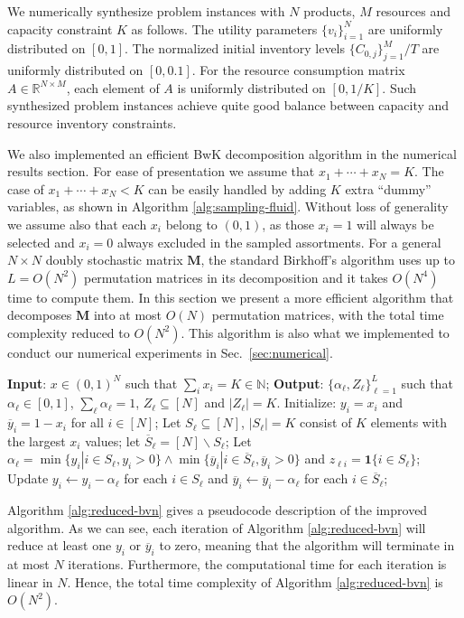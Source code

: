 \documentclass[opre]{informs3aa}
\newcommand{\vct}{\boldsymbol }
\newcommand{\mat}{\mathbf }
\renewcommand{\bar}{\overline}
\renewcommand{\bar}{\overline}
\begin{document}
\begin{appendices}
We numerically synthesize problem instances with $N$ products, $M$ resources and capacity constraint $K$ as follows.
The utility parameters $\{v_i\}_{i=1}^N$ are uniformly distributed on $[0,1]$.
The normalized initial inventory levels $\{C_{0,j}\}_{j=1}^M/T$ are uniformly distributed on $[0,0.1]$.
For the resource consumption matrix $A\in\mathbb R^{N\times M}$, each element of $A$ is uniformly distributed on $[0,1/K]$.
Such synthesized problem instances achieve quite good balance between capacity and resource inventory constraints.


We also implemented an efficient BwK decomposition algorithm in the numerical results section.
For ease of presentation we assume that $x_1+\cdots+x_N=K$. The case of $x_1+\cdots+x_N<K$ can be easily handled by adding $K$ extra
``dummy'' variables, as shown in Algorithm \ref{alg:sampling-fluid}.
Without loss of generality we assume also that each $x_i$ belong to $(0,1)$, as those $x_i=1$ will always be selected and $x_i=0$ always excluded in the sampled assortments.
For a general $N\times N$ doubly stochastic matrix $\mat M$, the standard Birkhoff's algorithm uses up to $L=O(N^2)$ permutation matrices in its decomposition
and it takes $O(N^4)$ time to compute them. In this section we present a more efficient algorithm that decomposes $\mat M$ into at most $O(N)$ permutation matrices, with the total time complexity reduced to $O(N^2)$.
This algorithm is also what we implemented to conduct our numerical experiments in Sec.~\ref{sec:numerical}.

\begin{algorithm}[t]
\caption{An improved algorithm for computing BvN decomposition}
\label{alg:reduced-bvn}
\begin{algorithmic}[1]
\State \textbf{Input}: $x\in(0,1)^N$ such that $\sum_i x_i=K\in\mathbb N$;
\State \textbf{Output}: $\{\alpha_\ell,Z_\ell\}_{\ell=1}^L$ such that $\alpha_\ell\in[0,1]$, $\sum_\ell\alpha_\ell=1$, $Z_\ell\subseteq[N]$ and $|Z_\ell|=K$.
\State Initialize: $y_i=x_i$ and $\bar y_i=1-x_i$ for all $i\in[N]$;
\For{$\ell=1,2,\cdots,L$ until $y_i=\bar y_i=0$ for all $i\in[N]$}
	\State Let $S_\ell\subseteq[N]$, $|S_\ell|=K$ consist of $K$ elements with the largest $x_i$ values; let $\bar S_\ell=[N]\backslash S_\ell$;
	\State Let $\alpha_\ell=\min\{y_i|i\in S_\ell,y_i>0\}\wedge \min\{\bar y_i|i\in \bar S_\ell,\bar y_i>0\}$ and $z_{\ell i}=\vct 1\{i\in S_\ell\}$;
	\State Update $y_i\gets y_i-\alpha_\ell$ for each $i\in S_\ell$ and $\bar y_i\gets \bar y_i-\alpha_\ell$ for each $i\in \bar S_\ell$;
\EndFor
\end{algorithmic}
\end{algorithm}

Algorithm \ref{alg:reduced-bvn} gives a pseudocode description of the improved algorithm.
As we can see, each iteration of Algorithm \ref{alg:reduced-bvn} will reduce at least one $y_i$ or $\bar y_i$ to zero,
meaning that the algorithm will terminate in at most $N$ iterations.
Furthermore, the computational time for each iteration is linear in $N$. Hence, the total time complexity of Algorithm \ref{alg:reduced-bvn} is $O(N^2)$.



\end{appendices}
\end{document}
